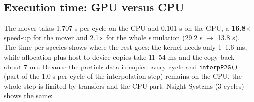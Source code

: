 \documentclass[11pt,a4paper]{article}
\begin{document}
\subsection{Execution time: GPU versus CPU}

The mover takes 1.707 s per cycle on the CPU and 0.101 s on the GPU, a \textbf{16.8$\times$} speed-up for the mover and
2.1$\times$ for the whole simulation (29.2 s $\to$ 13.8 s). The time per species shows where the rest goes: the kernel
needs only 1--1.6 ms, while allocation plus host-to-device copies take 11--54 ms and the copy back about 7 ms. Because
the particle data is copied every cycle and \texttt{interpP2G()} (part of the 1.0 s per cycle of the interpolation step) remains on the CPU, the whole step
is limited by transfers and the CPU part. Nsight Systems (3 cycles) shows the same:

\end{document}
